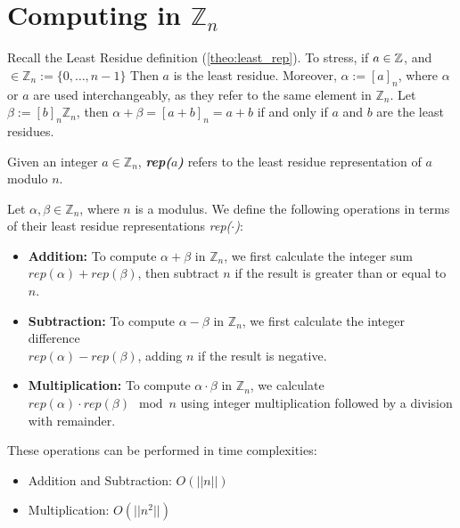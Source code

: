 \newpage 
\section{Computing in \(\mathbb{Z}_n\)}
Recall the Least Residue definition (\ref{theo:least_rep}). 
To stress, if $a\in\mathbb{Z}$, and $\in\mathbb{Z}_n:=\{0,\dots,n-1\}$ Then $a$ is the least residue.
Moreover, $\alpha:=[a]_n$, where $\alpha$ or $a$ are used interchangeably, as they refer to the same element in $\mathbb{Z}_n$.
Let $\beta:=[b]_n\mathbb{Z}_n$, then $\alpha+\beta=[a+b]_n=a+b$ if and only if $a$ and $b$ are the least residues. 

\begin{Func}

    Given an integer $a \in \mathbb{Z}_n$, \textbf{\textit{rep($a$)}} refers to the least residue representation of $a$ modulo $n$.
\end{Func}

\begin{theo}

    \label{theo:zn_operations}
    Let $\alpha, \beta \in \mathbb{Z}_n$, where $n$ is a modulus. We define the following operations in terms of their least residue representations \textit{rep($\cdot$)}:
    \begin{itemize}
        \item \textbf{Addition:} To compute \(\alpha + \beta\) in \(\mathbb{Z}_n\), we first calculate the integer sum \(\textit{rep}(\alpha) + \textit{rep}(\beta)\), then subtract $n$ if the result is greater than or equal to $n$.
        \item \textbf{Subtraction:} To compute \(\alpha - \beta\) in \(\mathbb{Z}_n\), we first calculate the integer difference\\
         \(\textit{rep}(\alpha) - \textit{rep}(\beta)\), adding $n$ if the result is negative.
        \item \textbf{Multiplication:} To compute \(\alpha \cdot \beta\) in \(\mathbb{Z}_n\), we calculate \(\textit{rep}(\alpha) \cdot \textit{rep}(\beta) \mod n\) using integer multiplication followed by a division with remainder.
    \end{itemize}
    These operations can be performed in time complexities:
    \begin{itemize}
        \item Addition and Subtraction: \(O(||n||)\)
        \item Multiplication: \(O(||n^2||)\)
    \end{itemize}
\end{theo}

